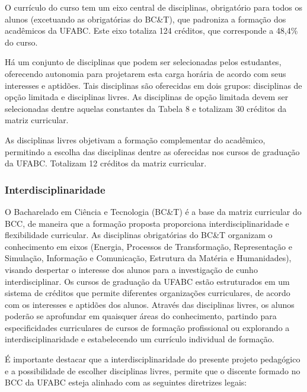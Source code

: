 \documentclass{article}
\begin{document}
O currículo do curso tem um eixo central de disciplinas, obrigatório para todos os alunos (excetuando as obrigatórias do BC\&T), que padroniza a formação dos acadêmicos da UFABC. Este eixo totaliza 124 créditos, que corresponde a 48,4\% do curso.

Há um conjunto de disciplinas que podem ser selecionadas pelos estudantes, oferecendo autonomia para projetarem esta carga horária de acordo com seus interesses e aptidões. Tais disciplinas são oferecidas em dois grupos: disciplinas de opção limitada e disciplinas livres. As disciplinas de opção limitada devem ser selecionadas dentre aquelas constantes da Tabela 8 e
totalizam 30 créditos da matriz curricular.

As disciplinas livres objetivam a formação complementar do acadêmico, permitindo a escolha das disciplinas dentre as oferecidas nos cursos de graduação da UFABC. Totalizam 12 créditos da matriz curricular.



\subsubsection{Interdisciplinaridade}
O Bacharelado em Ciência e Tecnologia (BC\&T) é a base da matriz curricular do BCC, de maneira que a formação proposta proporciona interdisciplinaridade e flexibilidade curricular. As disciplinas obrigatórias do BC\&T organizam o conhecimento em eixos (Energia, Processos de Transformação, Representação e Simulação, Informação e Comunicação, Estrutura da Matéria e Humanidades), visando despertar o interesse dos alunos para a investigação de cunho interdisciplinar. Os cursos de graduação da UFABC estão estruturados em um sistema de créditos que permite diferentes organizações curriculares, de acordo com os interesses e aptidões dos alunos. Através das disciplinas livres, os alunos poderão se aprofundar em quaisquer áreas do conhecimento, partindo para especificidades curriculares de cursos de formação profissional ou explorando a interdisciplinaridade e estabelecendo um currículo individual de formação.

É importante destacar que a interdisciplinaridade do presente projeto pedagógico e a possibilidade de escolher disciplinas livres, permite que o discente formado no BCC da UFABC esteja alinhado com as seguintes diretrizes legais:
\end{document}
